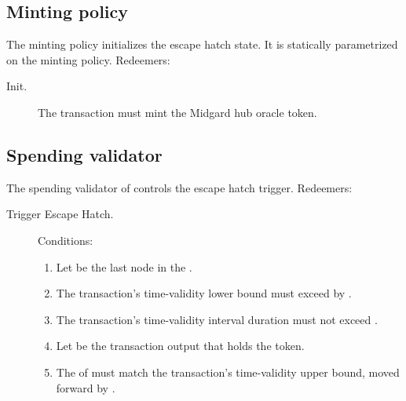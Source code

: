 \documentclass[../midgard.tex]{subfiles}
\begin{document}
\subsection{Minting policy}%
\label{h:escape-hatch-minting-policy}%

The  minting policy initializes the escape hatch state. It is statically parametrized on the  minting policy.
Redeemers:
\begin{description}
  \item[Init.] The transaction must mint the Midgard hub oracle token.
\end{description}

\subsection{Spending validator}%
\label{h:escape-hatch-spending-validator}%

The spending validator of  controls the escape hatch trigger.
Redeemers:
\begin{description}
  \item[Trigger Escape Hatch.] Conditions:
    \begin{enumerate}
      \item Let  be the last node in the .
      \item The transaction's time-validity lower bound must exceed  by .
      \item The transaction's time-validity interval duration must not exceed .
      \item Let  be the transaction output that holds the  token.
      \item The  of  must match the transaction's time-validity upper bound, moved forward by .
    \end{enumerate}
\end{description}
\end{document}
